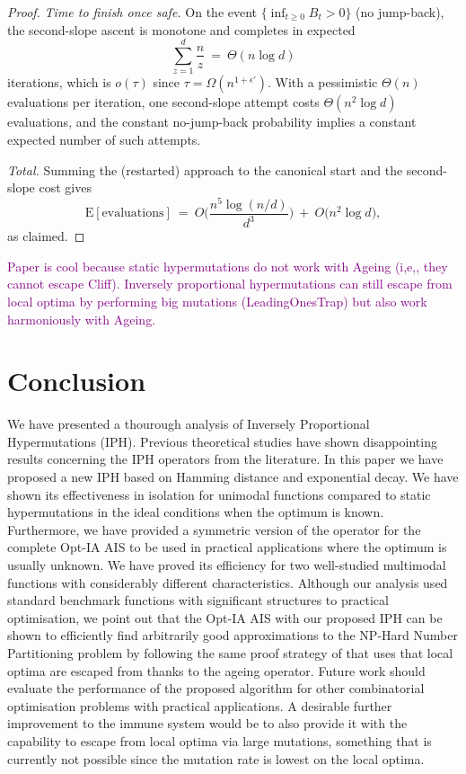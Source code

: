 \documentclass[lettersize,journal]{IEEEtran}
\newcommand{\EE}{\text{E}}
\begin{document}
\begin{proof}
	\smallskip
	\emph{Time to finish once safe.}
	On the event $\{\inf_{t\ge 0} B_t>0\}$ (no jump-back), the second-slope ascent is monotone and completes in expected
	\[
	\sum_{z=1}^{d}\frac{n}{z}\ =\ \Theta(n\log d)
	\]
	iterations, which is $o(\tau)$ since $\tau=\Omega(n^{1+\epsilon'})$. With a pessimistic $\Theta(n)$ evaluations per iteration, one second-slope attempt costs $\Theta(n^{2}\log d)$ evaluations, and the constant no-jump-back probability implies a constant expected number of such attempts.
	
	\smallskip
	\emph{Total.}
	Summing the (restarted) approach to the canonical start and the second-slope cost gives
	\[
	\EE[\text{evaluations}]
	\ =\ O\!\Big(\frac{n^{5}\log(n/d)}{d^{3}}\Big)\ +\ O\!\big(n^{2}\log d\big),
	\]
	as claimed.
\end{proof}




\textcolor{purple}{Paper is cool because static hypermutations do not work with Ageing (i,e,, they cannot escape Cliff). Inversely proportional hypermutations can still escape from local optima by performing big mutations (LeadingOnesTrap) but also work harmoniously with Ageing.}

\section{Conclusion}
We have presented a thourough analysis of Inversely Proportional Hypermutations (IPH).
Previous theoretical studies have shown disappointing results concerning the IPH operators from the literature.
In this paper we have proposed a new IPH based on Hamming distance and exponential decay.
We have shown its effectiveness in isolation for unimodal functions compared to static hypermutations in the ideal conditions when the optimum is known.
Furthermore, we have provided a symmetric version of the operator for the complete Opt-IA AIS to be used in practical applications where the optimum is usually unknown.
We have proved its efficiency for two well-studied multimodal functions with considerably different characteristics.
Although our analysis used standard benchmark functions with significant structures to practical optimisation, we point out that the Opt-IA AIS with our proposed IPH can be shown to efficiently find arbitrarily good approximations to the NP-Hard Number Partitioning problem by following the same proof strategy of \cite{CorusOlivetoYazdaniAIJ2019} that uses that local optima are escaped from thanks to the ageing operator.
Future work should evaluate the performance of the proposed algorithm for other combinatorial optimisation problems with practical applications. A desirable further improvement to the immune system would be to also provide it with the capability to escape from local optima via large mutations, something that is currently not possible since the mutation rate is lowest on the local optima.
\end{document}
